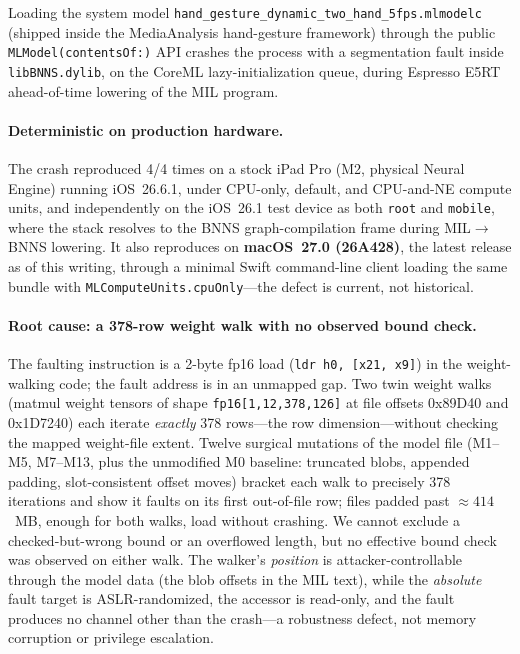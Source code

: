 \documentclass[letterpaper,twocolumn,10pt]{article}
\begin{document}
Loading the system model
\texttt{hand\_gesture\_}\allowbreak\texttt{dynamic\_two\_}\allowbreak\texttt{hand\_5fps.mlmodelc} (shipped inside
the MediaAnalysis hand-gesture framework) through the public
\texttt{MLModel(contentsOf:)} API crashes the process with a segmentation
fault inside \texttt{libBNNS.dylib}, on the CoreML lazy-initialization
queue, during Espresso E5RT ahead-of-time lowering of the MIL program.

\paragraph{Deterministic on production hardware.}
The crash reproduced 4/4 times on a stock iPad Pro (M2, physical Neural
Engine) running iOS~26.6.1, under CPU-only, default, and CPU-and-NE compute
units, and independently on the iOS~26.1 test device as both
\texttt{root} and \texttt{mobile}, where the stack resolves to the BNNS
graph-compilation frame during MIL$\rightarrow$BNNS lowering.
It also reproduces on \textbf{macOS~27.0 (26A428)}, the latest release as of
this writing, through a minimal Swift command-line client loading the same
bundle with \texttt{MLComputeUnits.cpuOnly}---the defect is current, not
historical.

\paragraph{Root cause: a 378-row weight walk with no observed bound check.}
The faulting instruction is a 2-byte fp16 load
(\texttt{ldr h0, [x21, x9]}) in the weight-walking code; the fault address
is in an unmapped gap.
Two twin weight walks (matmul weight tensors of shape
\texttt{fp16[1,12,378,126]} at file offsets 0x89D40 and 0x1D7240) each
iterate \emph{exactly} 378 rows---the row dimension---without checking the
mapped weight-file extent.
Twelve surgical mutations of the model file (M1--M5, M7--M13, plus the
unmodified M0 baseline: truncated
blobs, appended padding, slot-consistent offset moves) bracket each walk to
precisely 378 iterations and show it faults on its first out-of-file row;
files padded past ${\approx}414$~MB, enough for both walks, load without
crashing.
We cannot exclude a checked-but-wrong bound or an overflowed length, but no
effective bound check was observed on either walk.
The walker's \emph{position} is attacker-controllable through the model
data (the blob offsets in the MIL text), while the \emph{absolute} fault
target is ASLR-randomized, the accessor is read-only, and the fault produces
no channel other than the crash---a robustness defect, not memory
corruption or privilege escalation.
\end{document}
